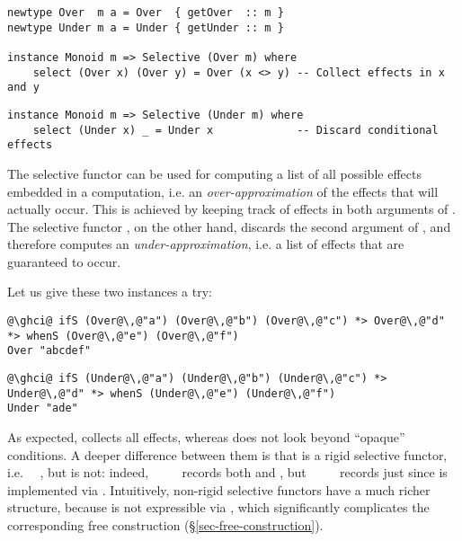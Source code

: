 {\vspace{1mm}
\begin{verbatim}
newtype Over  m a = Over  { getOver  :: m }
newtype Under m a = Under { getUnder :: m }

instance Monoid m => Selective (Over m) where
    select (Over x) (Over y) = Over (x <> y) -- Collect effects in x and y
\end{verbatim}
\vspace{1mm}
\begin{verbatim}
instance Monoid m => Selective (Under m) where
    select (Under x) _ = Under x             -- Discard conditional effects
\end{verbatim}
\vspace{1mm}

\noindent
The selective functor  can be used for computing a list of all possible
effects embedded in a computation, i.e. an \emph{over-approximation} of the
effects that will actually occur. This is achieved by keeping track of effects
in both arguments of . The selective functor , on the other
hand, discards the second argument of , and therefore computes an
\emph{under-approximation}, i.e. a list of effects that are guaranteed to occur.

\noindent
Let us give these two instances a try:

\vspace{1mm}
\begin{verbatim}
@\ghci@ ifS (Over@\,@"a") (Over@\,@"b") (Over@\,@"c") *> Over@\,@"d" *> whenS (Over@\,@"e") (Over@\,@"f")
Over "abcdef"
\end{verbatim}
\vspace{1mm}
\begin{verbatim}
@\ghci@ ifS (Under@\,@"a") (Under@\,@"b") (Under@\,@"c") *> Under@\,@"d" *> whenS (Under@\,@"e") (Under@\,@"f")
Under "ade"
\end{verbatim}
\vspace{1mm}

\noindent
As expected,  collects all effects, whereas  does not look
beyond ``opaque'' conditions. A deeper difference between them is that 
is a rigid selective functor, i.e. \hs{(<*>)}~\hs{=}~, but  is
not: indeed, ~~\hs{<*>}~~ records both
 and , but ~~~~
records just  since  is implemented via .
Intuitively, non-rigid selective functors have a much richer structure, because
\hs{<*>} is not expressible via , which significantly complicates the
corresponding free construction (\S\ref{sec-free-construction}).

}
